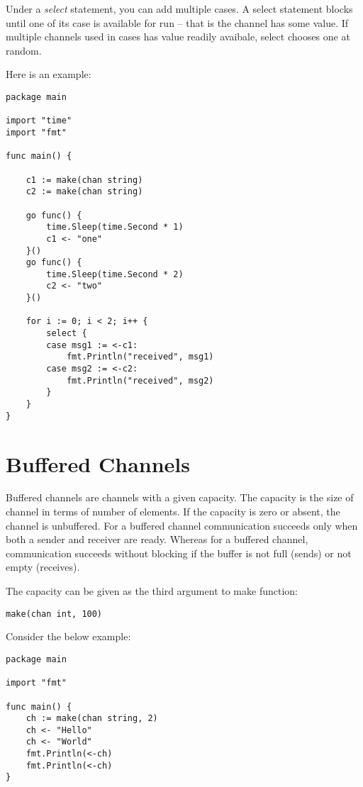 Under a \emph{select} statement, you can add multiple cases.  A select
statement blocks until one of its case is available for run -- that is
the channel has some value.  If multiple channels used in cases has
value readily avaibale, select chooses one at random.

Here is an example:

\begin{lstlisting}[numbers=none]
package main

import "time"
import "fmt"

func main() {

    c1 := make(chan string)
    c2 := make(chan string)

    go func() {
        time.Sleep(time.Second * 1)
        c1 <- "one"
    }()
    go func() {
        time.Sleep(time.Second * 2)
        c2 <- "two"
    }()

    for i := 0; i < 2; i++ {
        select {
        case msg1 := <-c1:
            fmt.Println("received", msg1)
        case msg2 := <-c2:
            fmt.Println("received", msg2)
        }
    }
}
\end{lstlisting}


\section{Buffered Channels}

Buffered channels are channels with a given
capacity.  The capacity is the size of channel in terms of number of
elements.  If the capacity is zero or absent, the channel is
unbuffered.  For a buffered channel communication succeeds only when
both a sender and receiver are ready.  Whereas for a buffered channel,
communication succeeds without blocking if the buffer is not full
(sends) or not empty (receives).

The capacity can be given as the third argument to make function:

\begin{lstlisting}[numbers=none]
make(chan int, 100)
\end{lstlisting}

Consider the below example:

\begin{lstlisting}[caption=Buffered Channel]
package main

import "fmt"

func main() {
    ch := make(chan string, 2)
    ch <- "Hello"
    ch <- "World"
    fmt.Println(<-ch)
    fmt.Println(<-ch)
}
\end{lstlisting}

